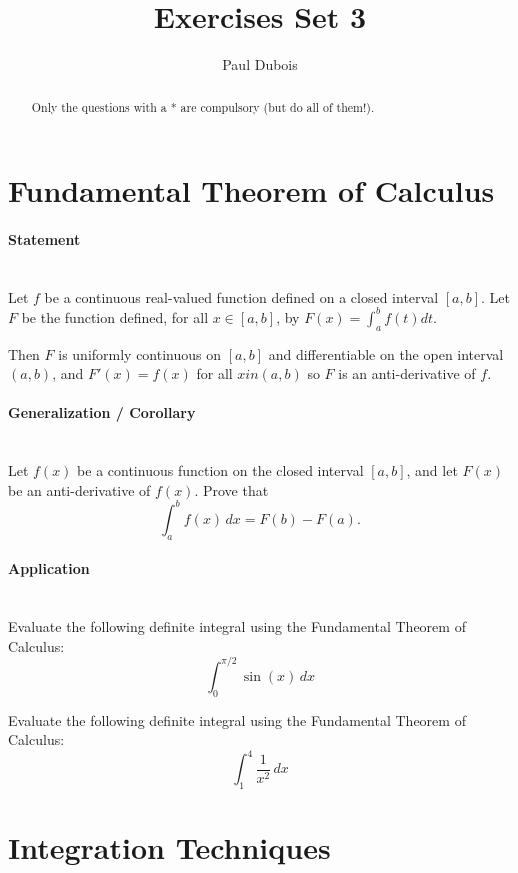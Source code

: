 \documentclass[]{article}
\title{Exercises Set 3}
\author{Paul Dubois}
\begin{document}
	\maketitle
	
	\begin{abstract}
		Only the questions with a * are compulsory (but do all of them!).
	\end{abstract}
	
	\section{Fundamental Theorem of Calculus}
	\paragraph{Statement}\mbox{}\\
	Let $f$ be a continuous real-valued function defined on a closed interval $\left[ a,b \right]$.
	Let $F$ be the function defined, for all $x \in \left[ a,b \right]$, by $F(x) = \int_a^b f(t) dt$.
	
	Then $F$ is uniformly continuous on $\left[ a,b \right]$ and differentiable on the open interval $\left( a,b \right)$, and $F'(x) = f(x)$ for all $x in \left( a,b \right)$ so $F$ is an anti-derivative of $f$.
	
	\paragraph{Generalization / Corollary}\mbox{}\\
	Let \( f(x) \) be a continuous function on the closed interval \([a, b]\), and let \( F(x) \) be an anti-derivative of \( f(x) \).
	Prove that
	\[
	\int_a^b f(x) \, dx = F(b) - F(a).
	\]
	
	\paragraph{Application}\mbox{}\\
	Evaluate the following definite integral using the Fundamental Theorem of Calculus:
	\[
	\int_0^{\pi/2} \sin(x) \, dx
	\]
	
	Evaluate the following definite integral using the Fundamental Theorem of Calculus:
	\[
	\int_1^4 \frac{1}{x^2} \, dx
	\]
	
	
	\section{Integration Techniques}
\end{document}
